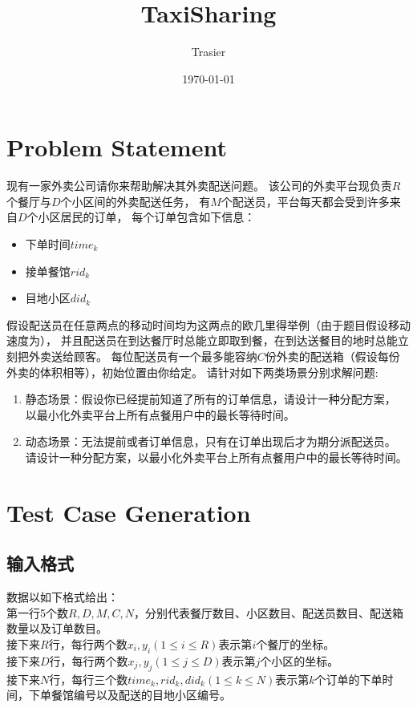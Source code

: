\documentclass[hyperref,UTF8]{ctexart}
\theoremstyle{definition}
\theoremstyle{remark}
\numberwithin{equation}{subsection}
\begin{document}
\title{\Huge TaxiSharing}
\vspace{2cm}
\author{\Large Trasier}
\date{\today}
\maketitle

\section{Problem Statement}
\label{sec:problem_statement}
	
	现有一家外卖公司请你来帮助解决其外卖配送问题。
	该公司的外卖平台现负责$R$个餐厅与$D$个小区间的外卖配送任务，
	有$M$个配送员，平台每天都会受到许多来自$D$个小区居民的订单，
	每个订单包含如下信息：
	\begin{itemize}
		\item 下单时间$time_k$
		\item 接单餐馆$rid_k$
		\item 目地小区$did_k$
	\end{itemize}
	假设配送员在任意两点的移动时间均为这两点的欧几里得举例（由于题目假设移动速度为），
	并且配送员在到达餐厅时总能立即取到餐，在到达送餐目的地时总能立刻把外卖送给顾客。
	每位配送员有一个最多能容纳$C$份外卖的配送箱（假设每份外卖的体积相等），初始位置由你给定。
	请针对如下两类场景分别求解问题:
	\begin{enumerate}[(1)]
		\item 静态场景：假设你已经提前知道了所有的订单信息，请设计一种分配方案，
		以最小化外卖平台上所有点餐用户中的最长等待时间。
		\item 动态场景：无法提前或者订单信息，只有在订单出现后才为期分派配送员。
		请设计一种分配方案，以最小化外卖平台上所有点餐用户中的最长等待时间。
	\end{enumerate}

\section{Test Case Generation}
\label{sec:test_case_generation}
		
\subsection{输入格式}	
	
	数据以如下格式给出：	\\
	第一行5个数$R,D,M,C,N$，分别代表餐厅数目、小区数目、配送员数目、配送箱数量以及订单数目。	\\
	接下来$R$行，每行两个数$x_i, y_i(1 \le i \le R)$表示第$i$个餐厅的坐标。	\\
	接下来$D$行，每行两个数$x_j, y_j(1 \le j \le D)$表示第$j$个小区的坐标。	\\
	接下来$N$行，每行三个数$time_k, rid_k, did_k(1 \le k \le N)$表示第$k$个订单的下单时间，下单餐馆编号以及配送的目地小区编号。	\\
\end{document}
